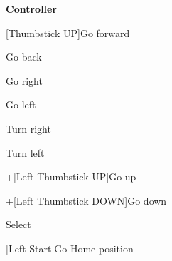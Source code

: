\documentclass[12pt,dvipdfmx]{article}
\begin{document}
\begin{center}

{\bf \LARGE Controller}

\end{center}

{\Large
[Thumbstick UP]\quad Go forward \par 
[Thumbstick DOWN]\quad Go back \par 
\smallskip\par
[Left Thumbstick RIGHT]\quad Go right \par 
[Left Thumbstick LEFT]\quad Go left \par 
\smallskip\par
[Right Thumbstick RIGHT]\quad Turn right \par 
[Right Thumbstick LEFT]\quad Turn left \par 
\smallskip\par
[Left Index Trigger]+[Left Thumbstick UP]\quad Go up \par 
[Left Index Trigger]+[Left Thumbstick DOWN]\quad Go down \par 
\bigskip\par
[Right Index Trigger]\quad Select

[Left Start]\quad Go Home position

}
\end{document}
